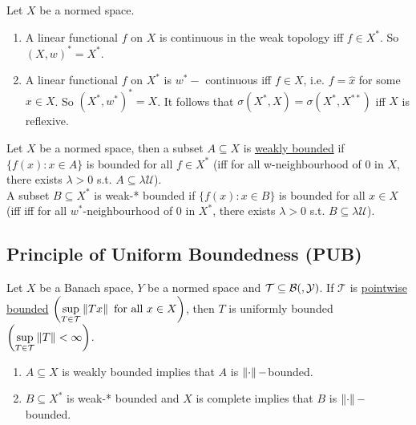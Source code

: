 \documentclass{article}
\begin{document}
\begin{boxprop}\label{prop: characterisation of weak topology in terms of dual}
    Let $X$ be a normed space. 
    \begin{enumerate}[label = (\roman*), align = left]
        \item A linear functional $f$ on $X$ is continuous in the weak topology iff $f\in X^*$. So $(X, w)^*=X^*$.
        \item A linear functional $f$ on $X^*$ is $w^*-$ continuous iff $f\in X$, i.e. $f = \hat{x}$ for some $x\in X$. So $(X^*, w^*)^*=X$. It follows that $\sigma(X^*, X)=\sigma(X^*, X^{**})$ iff $X$ is reflexive.
    \end{enumerate}
\end{boxprop}

\begin{boxdef}\label{def: weak boundedness}
    Let $X$ be a normed space, then a subset $A\subseteq X$ is \noindent\underline{weakly bounded} if $\{f(x):x\in A\}$ is bounded for all $f\in X^*$ (iff for all w-neighbourhood of $0$ in $X$, there exists $\lambda>0$ s.t. $A\subseteq \lambda\mathcal{U}$). \\
    A subset $B\subseteq X^*$ is weak-* bounded if $\{f(x):x\in B\}$ is bounded for all $x\in X$ (iff iff for all $w^*$-neighbourhood of $0$ in $X^*$, there exists $\lambda>0$ s.t. $B\subseteq \lambda\mathcal{U}$).
\end{boxdef}

\subsection{Principle of Uniform Boundedness (PUB)}

Let $X$ be a Banach space, $Y$ be a normed space and $\mathcal{T}\subseteq\mathcal{B}(\markright{X}, \mathcal{Y})$. If $\mathcal{T}$ is \noindent\underline{pointwise bounded} $\left(\displaystyle\sup_{T\in\mathcal{T}}\left\lVert Tx\right\rVert \text{ for all } x\in X\right)$, then $T$ is uniformly bounded $\left(\displaystyle\sup_{T\in\mathcal{T}}\left\lVert T\right\rVert<\infty\right)$.

\begin{boxprop}\label{prop: PUB}
    \begin{enumerate}[label=(\roman*)]
        \item $A\subseteq X$ is weakly bounded implies that $A$ is $\left\lVert\cdot\right\rVert-$bounded.
        \item $B\subseteq X^*$ is weak-* bounded and $X$ is complete implies that $B$ is $\left\lVert\cdot\right\rVert-$bounded.
    \end{enumerate}
\end{boxprop}
\end{document}
